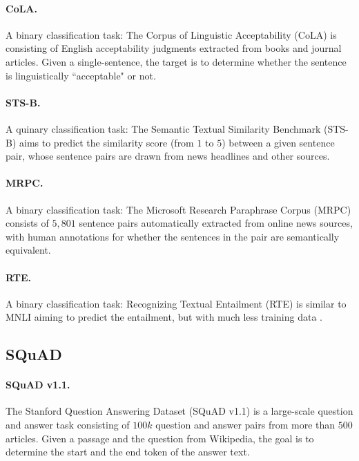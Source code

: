 \documentclass[letterpaper]{article} \usepackage{aaai22}  \usepackage{times}  \usepackage{helvet}  \usepackage{courier}  \usepackage[hyphens]{url}  \usepackage{graphicx} \urlstyle{rm} \def\UrlFont{\rm}  \usepackage{natbib}  \usepackage{caption} \DeclareCaptionStyle{ruled}{labelfont=normalfont,labelsep=colon,strut=off} \frenchspacing  \setlength{\pdfpagewidth}{8.5in}  \setlength{\pdfpageheight}{11in}  \usepackage{algorithm}
\begin{document}
\paragraph{CoLA.}
A binary classification task: The Corpus of Linguistic Acceptability (CoLA) \citep{warstadt2019neural} is consisting of English acceptability judgments extracted from books and journal articles. Given a single-sentence, the target is to determine whether the sentence is linguistically ``acceptable" or not.

\paragraph{STS-B.}
A quinary classification task: The Semantic Textual Similarity Benchmark (STS-B) \citep{cer2017semeval} aims to predict the similarity score (from $1$ to $5$) between a given sentence pair, whose sentence pairs are drawn from news headlines and other sources.

\paragraph{MRPC.}
A binary classification task: The Microsoft Research Paraphrase Corpus (MRPC) \citep{dolan2005automatically} consists of $5,801$ sentence pairs automatically extracted from online news sources, with human annotations for whether the sentences in the pair are semantically equivalent.

\paragraph{RTE.}
A binary classification task: Recognizing Textual Entailment (RTE) is similar to MNLI aiming to predict the entailment, but with much less training data \citep{dagan2005pascal}.

\subsection{SQuAD}
\paragraph{SQuAD v1.1.}
The Stanford Question Answering Dataset (SQuAD v1.1) \cite{rajpurkar2016squad} is a large-scale question and answer task consisting of $100k$ question and answer pairs from more than $500$ articles. Given a passage and the question from Wikipedia, the goal is to determine the start and the end token of the answer text.
\end{document}
